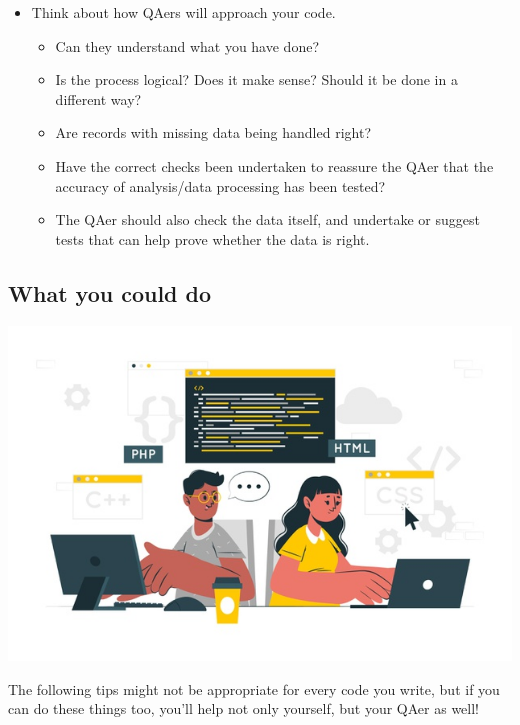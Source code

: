 \documentclass[
]{article}
\providecommand{\tightlist}{%
  \setlength{\itemsep}{0pt}\setlength{\parskip}{0pt}}
\begin{document}
\begin{itemize}
\tightlist
\item
  Think about how QAers will approach your code.

  \begin{itemize}
  \tightlist
  \item
    Can they understand what you have done?
  \item
    Is the process logical? Does it make sense? Should it be done in a different way?
  \item
    Are records with missing data being handled right?
  \item
    Have the correct checks been undertaken to reassure the QAer that the accuracy of analysis/data processing has been tested?
  \item
    The QAer should also check the data itself, and undertake or suggest tests that can help prove whether the data is right.
  \end{itemize}
\end{itemize}

\hypertarget{what-you-could-do}{%
\subsection{\texorpdfstring{What you \textbf{could} do}{What you could do}}\label{what-you-could-do}}

\includegraphics{pictures/code-2.jpg}

The following tips might not be appropriate for every code you write, but if you can do these things too, you'll help not only yourself, but your QAer as well!
\end{document}
